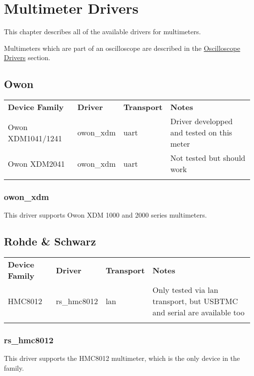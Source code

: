 \chapter{Multimeter Drivers}
\label{sec:meter-drivers}

This chapter describes all of the available drivers for multimeters.

Multimeters which are part of an oscilloscope are described in the \hyperref[sec:scope-drivers]{Oscilloscope
Drivers} section.

\section{Owon}

\begin{tabularx}{16cm}{lllX}
\thickhline
\textbf{Device Family} & \textbf{Driver} & \textbf{Transport} & \textbf{Notes} \\
\thickhline
Owon XDM1041/1241 & owon\_xdm & uart & Driver developped and tested on this meter\\
\thinhline
Owon XDM2041 & owon\_xdm & uart & Not tested but should work\\
\thickhline
\end{tabularx}

\subsection{owon\_xdm}

This driver supports Owon XDM 1000 and 2000 series multimeters.

\section{Rohde \& Schwarz}

\begin{tabularx}{16cm}{lllX}
\thickhline
\textbf{Device Family} & \textbf{Driver} & \textbf{Transport} & \textbf{Notes} \\
\thickhline
HMC8012 & rs\_hmc8012 & lan & Only tested via lan transport, but USBTMC and serial are available too\\
\thickhline
\end{tabularx}

\subsection{rs\_hmc8012}

This driver supports the HMC8012 multimeter, which is the only device in the family.
